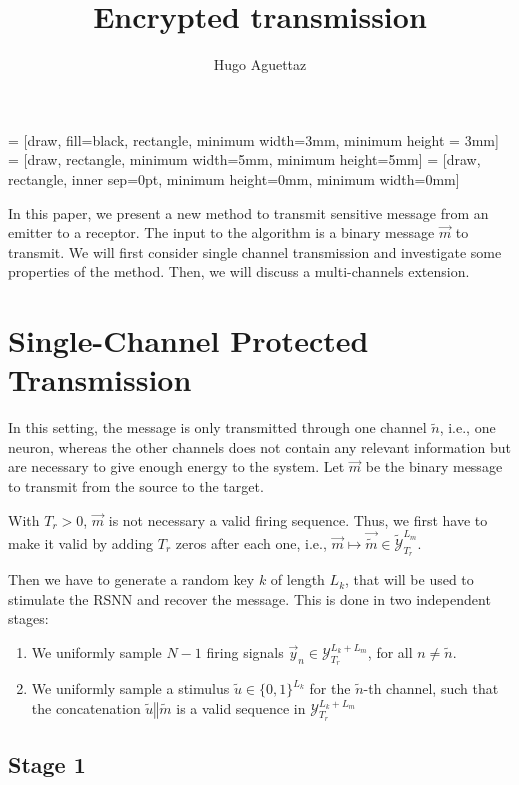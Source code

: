 \documentclass{article}
\title{Encrypted transmission}
\author{Hugo Aguettaz}
\begin{document}
\maketitle
     = [draw, fill=black, rectangle, minimum width=3mm, minimum height = 3mm]
     = [draw, rectangle, minimum width=5mm, minimum height=5mm]
     = [draw, rectangle, inner sep=0pt, minimum height=0mm, minimum width=0mm] 

    In this paper, we present a new method to transmit sensitive message from an emitter to a receptor. The input to the algorithm is a binary message $\vec{m}$ to transmit. We will first consider single channel transmission and investigate some properties of the method. Then, we will discuss a multi-channels extension.

    \section{Single-Channel Protected Transmission}

    In this setting, the message is only transmitted through one channel $\tilde{n}$, i.e., one neuron, whereas the other channels does not contain any relevant information but are necessary to give enough energy to the system. Let $\vec{m}$ be the binary message to transmit from the source to the target. 
    
    With $T_r > 0$, $\vec{m}$ is not necessary a valid firing sequence. Thus, we first have to make it valid by adding $T_r$ zeros after each one, i.e., $\vec{m} \mapsto \vec{\tilde{m}} \in \tilde{\mathcal{Y}}^{L_m}_{T_r}$.

    Then we have to generate a random key $k$ of length $L_k$, that will be used to stimulate the RSNN and recover the message. This is done in two independent stages:
    \begin{enumerate}
        \item We uniformly sample $N-1$ firing signals $\vec{y}_{n} \in \mathcal{Y}^{L_k + L_m}_{T_r}$, for all $n \neq \tilde{n}$.
        \item We uniformly sample a stimulus $\tilde{u} \in \{0, 1\}^{L_k}$ for the $\tilde{n}$-th channel, such that the concatenation $\tilde{u} \mathbin\Vert \tilde{m}$ is a valid sequence in $\mathcal{Y}^{L_k + L_m}_{T_r}$
    \end{enumerate}

    \subsection{Stage 1}
\end{document}
